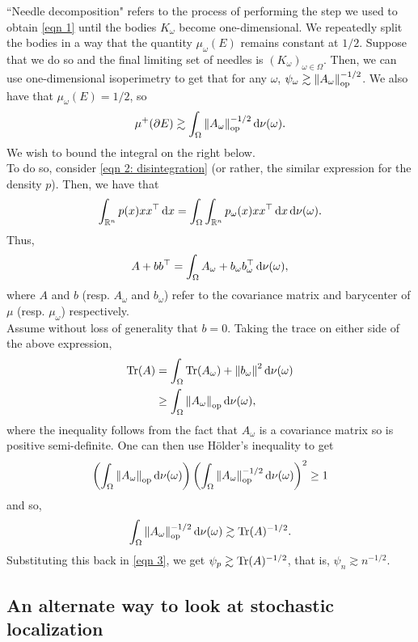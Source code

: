\documentclass{article}
\begin{document}
``Needle decomposition" refers to the process of performing the step we used to obtain \eqref{eqn 1} until the bodies $K_\omega$ become one-dimensional. We repeatedly split the bodies in a way that the quantity $\mu_\omega(E)$ remains constant at $1/2$. Suppose that we do so and the final limiting set of needles is $(K_\omega)_{\omega\in\Omega}$. Then, we can use one-dimensional isoperimetry to get that for any $\omega$, $\psi_\omega \gtrsim \left\lVert A_\omega\right\rVert_{\text{op}}^{-1/2}$. We also have that $\mu_\omega(E) = 1/2$, so
\begin{equation}
	\label{eqn 3}
	\mu^+(\partial E) \gtrsim \int_\Omega \left\lVert A_\omega\right\rVert_{\text{op}}^{-1/2} \operatorname{d}\!{\nu}(\omega).
\end{equation}
We wish to bound the integral on the right below.\\

To do so, consider \eqref{eqn 2: disintegration} (or rather, the similar expression for the density $p$). Then, we have that
\[ \int_{\mathbb{R}^n} p(x) xx^\top \operatorname{d}\!{x} = \int_\Omega \int_{\mathbb{R}^n} p_\omega(x) xx^\top \operatorname{d}\!{x} \operatorname{d}\!{\nu(\omega)}. \]
Thus,
\begin{equation}
	\label{eqn 5}
	A + bb^\top = \int_\Omega A_\omega + b_\omega b_\omega^\top \operatorname{d}\!{\nu(\omega)},
\end{equation}
where $A$ and $b$ (resp. $A_\omega$ and $b_\omega$) refer to the covariance matrix and barycenter of $\mu$ (resp. $\mu_\omega$) respectively.\\
Assume without loss of generality that $b = 0$. Taking the trace on either side of the above expression,
\begin{align*}
	\operatorname{Tr}(A) &= \int_\Omega \operatorname{Tr}(A_\omega) + \left\lVert b_\omega\right\rVert^2 \operatorname{d}\!{\nu(\omega)} \\
		&\geq \int_\Omega \left\lVert A_\omega\right\rVert_{\text{op}} \operatorname{d}\!{\nu(\omega)},
\end{align*}
where the inequality follows from the fact that $A_\omega$ is a covariance matrix so is positive semi-definite.
One can then use H\"older's inequality to get
\[ \left(\int_\Omega \left\lVert A_\omega\right\rVert_{\text{op}} \operatorname{d}\!{\nu(\omega)} \right) \left( \int_\Omega \left\lVert A_\omega\right\rVert_{\text{op}}^{-1/2} \operatorname{d}\!{\nu(\omega)} \right)^2 \geq 1 \]
and so,
\[ \int_\Omega \left\lVert A_\omega\right\rVert_{\text{op}}^{-1/2} \operatorname{d}\!{\nu(\omega)} \gtrsim \operatorname{Tr}(A)^{-1/2}.  \]
Substituting this back in \eqref{eqn 3}, we get $\psi_p \gtrsim \operatorname{Tr}(A)^{-1/2}$, that is, $\psi_n \gtrsim n^{-1/2}$.

\subsection{An alternate way to look at stochastic localization}
\end{document}
